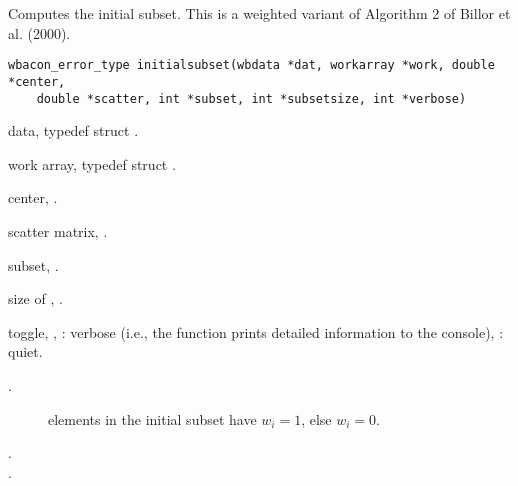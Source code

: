 \documentclass[a4paper,oneside,10pt,DIV=12]{scrreprt}
\begin{document}
\begin{Description}
Computes the initial subset. This is a weighted variant of Algorithm 2 of Billor
et al. (2000). 
\end{Description}
\begin{Usage}
\begin{verbatim}
wbacon_error_type initialsubset(wbdata *dat, workarray *work, double *center,
    double *scatter, int *subset, int *subsetsize, int *verbose)
\end{verbatim}
\end{Usage}
\begin{Arguments}
	\begin{ldescription}
		\item[\code{dat}] data, typedef struct .
		\item[\code{work}] work array, typedef struct .
		\item[\code{center}] center, .
		\item[\code{scatter}] scatter matrix, .
		\item[\code{subset}] subset, .
		\item[\code{subsetsize}] size of , \code{[int]}.
		\item[\code{verbose}] toggle, \code{[int]}, : verbose (i.e., the
			function prints detailed information to the console), :
			quiet.
	\end{ldescription}
\end{Arguments}
\begin{Value}
\begin{description}
	\item[.]
	\item[] elements in the initial subset have $w_i=1$, else $w_i=0$.
	\item[.]
	\item[.]
\end{description}
\end{Value}
\end{document}
